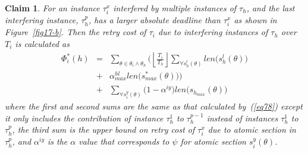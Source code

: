 \documentclass[conference]{IEEEtran}
\newtheorem{clm}{Claim}
\begin{document}
\begin{clm}\label{max block}
For an instance $\tau_i^x$ interfered by multiple instances of $\tau_h$, and the last interfering instance, $\tau_h^p$, has a larger absolute deadline than $\tau_i^x$ as shown in Figure~\ref{fig17-b}. Then the retry cost of $\tau_i$ due to interfering instances of $\tau_h$ over $T_i$ is calculated as
\begin{eqnarray}
\Phi_i^*(h) & = & \sum_{\theta \in \theta_i \wedge \theta_h}\Bigg(\left\lfloor\frac{T_{i}}{T_{h}}\right\rfloor\sum_{\forall s_{h}^{l}(\theta)}len\Big(s_{h}^{l}(\theta)\Big)\nonumber\\
& + & \alpha_{max}^{hl}len\Big(s_{max}^{*}(\theta)\Big)\Bigg)\nonumber\\
& + & \sum_{\forall s_{i}^{y}(\theta)}\Big(1-\alpha^{iy}\Big)len\Big(s_{h_{max}}(\theta)\Big)  
\label{eq53}\end{eqnarray} 
where the first and second sums are the same as that calculated by~(\ref{eq78}) except it only includes the contribution of instance $\tau_h^1$ to $\tau_h^{p-1}$ instead of instances $\tau_h^1$ to $\tau_h^p$, the third sum is the upper bound on retry cost of $\tau_i^x$ due to atomic section in $\tau_h^p$, and $\alpha^{iy}$ is the $\alpha$ value that corresponds to $\psi$ for atomic section $s_i^y(\theta)$.
\end{clm}
%
\end{document}
